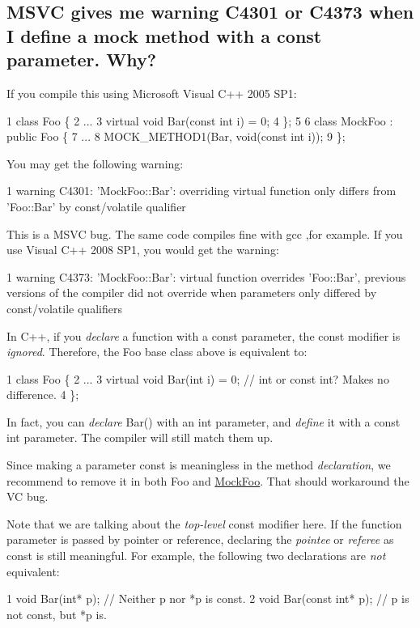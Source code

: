 \subsection*{M\+S\+VC gives me warning C4301 or C4373 when I define a mock method with a const parameter. Why?}

If you compile this using Microsoft Visual C++ 2005 S\+P1\+: 
\begin{DoxyCode}
1 class Foo \{
2   ...
3   virtual void Bar(const int i) = 0;
4 \};
5 
6 class MockFoo : public Foo \{
7   ...
8   MOCK\_METHOD1(Bar, void(const int i));
9 \};
\end{DoxyCode}
 You may get the following warning\+: 
\begin{DoxyCode}
1 warning C4301: 'MockFoo::Bar': overriding virtual function only differs from 'Foo::Bar' by const/volatile
       qualifier
\end{DoxyCode}


This is a M\+S\+VC bug. The same code compiles fine with gcc ,for example. If you use Visual C++ 2008 S\+P1, you would get the warning\+: 
\begin{DoxyCode}
1 warning C4373: 'MockFoo::Bar': virtual function overrides 'Foo::Bar', previous versions of the compiler did
       not override when parameters only differed by const/volatile qualifiers
\end{DoxyCode}


In C++, if you {\itshape declare} a function with a {\ttfamily const} parameter, the {\ttfamily const} modifier is {\itshape ignored}. Therefore, the {\ttfamily Foo} base class above is equivalent to\+: 
\begin{DoxyCode}
1 class Foo \{
2   ...
3   virtual void Bar(int i) = 0;  // int or const int?  Makes no difference.
4 \};
\end{DoxyCode}


In fact, you can {\itshape declare} Bar() with an {\ttfamily int} parameter, and {\itshape define} it with a {\ttfamily const int} parameter. The compiler will still match them up.

Since making a parameter {\ttfamily const} is meaningless in the method {\itshape declaration}, we recommend to remove it in both {\ttfamily Foo} and {\ttfamily \hyperlink{class_mock_foo}{Mock\+Foo}}. That should workaround the VC bug.

Note that we are talking about the {\itshape top-\/level} {\ttfamily const} modifier here. If the function parameter is passed by pointer or reference, declaring the {\itshape pointee} or {\itshape referee} as {\ttfamily const} is still meaningful. For example, the following two declarations are {\itshape not} equivalent\+: 
\begin{DoxyCode}
1 void Bar(int* p);        // Neither p nor *p is const.
2 void Bar(const int* p);  // p is not const, but *p is.
\end{DoxyCode}


